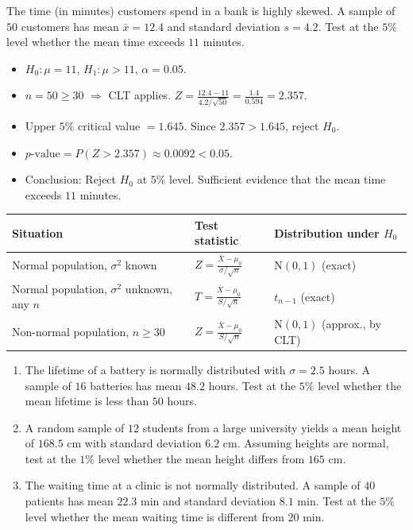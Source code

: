 \documentclass[11pt]{article}
\begin{document}
\begin{exemplebox}
The time (in minutes) customers spend in a bank is highly skewed. A sample of $50$ customers has mean $\bar{x} = 12.4$ and standard deviation $s = 4.2$. Test at the $5\%$ level whether the mean time exceeds $11$ minutes.
\begin{itemize}
\item $H_0 : \mu = 11$, $H_1 : \mu > 11$, $\alpha = 0.05$.
\item $n = 50 \ge 30$ $\Rightarrow$ CLT applies. $Z = \frac{12.4 - 11}{4.2/\sqrt{50}} = \frac{1.4}{0.594} = 2.357$.
\item Upper $5\%$ critical value $= 1.645$. Since $2.357 > 1.645$, reject $H_0$.
\item $p\text{-value} = P(Z > 2.357) \approx 0.0092 < 0.05$.
\item Conclusion: Reject $H_0$ at $5\%$ level. Sufficient evidence that the mean time exceeds $11$ minutes.
\end{itemize}
\end{exemplebox}

\begin{aretenir}
\begin{center}
\begin{tabularx}{\linewidth}{|l|X|X|}
\hline
\rowcolor{popblueL} \textbf{Situation} & \textbf{Test statistic} & \textbf{Distribution under $H_0$} \\
\hline
Normal population, $\sigma^2$ known & $Z = \frac{\bar{X}-\mu_0}{\sigma/\sqrt{n}}$ & $\mathrm{N}(0,1)$ (exact) \\
\hline
\rowcolor{popblueL} Normal population, $\sigma^2$ unknown, any $n$ & $T = \frac{\bar{X}-\mu_0}{S/\sqrt{n}}$ & $t_{n-1}$ (exact) \\
\hline
Non-normal population, $n \ge 30$ & $Z = \frac{\bar{X}-\mu_0}{S/\sqrt{n}}$ & $\mathrm{N}(0,1)$ (approx., by CLT) \\
\hline
\end{tabularx}
\end{center}
\end{aretenir}

\begin{exercice}
\begin{enumerate}
\item The lifetime of a battery is normally distributed with $\sigma = 2.5$ hours. A sample of $16$ batteries has mean $48.2$ hours. Test at the $5\%$ level whether the mean lifetime is less than $50$ hours.
\item A random sample of $12$ students from a large university yields a mean height of $168.5$ cm with standard deviation $6.2$ cm. Assuming heights are normal, test at the $1\%$ level whether the mean height differs from $165$ cm.
\item The waiting time at a clinic is not normally distributed. A sample of $40$ patients has mean $22.3$ min and standard deviation $8.1$ min. Test at the $5\%$ level whether the mean waiting time is different from $20$ min.
\end{enumerate}
\end{exercice}
\end{document}
